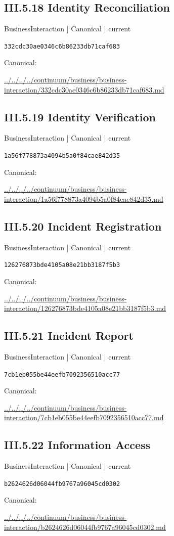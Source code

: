 \documentclass[10pt,a4paper]{article}
\begin{document}
\subsection*{III.5.18 Identity Reconciliation}
{\small BusinessInteraction | Canonical | current}\par
\texttt{332cdc30ae0346c6b86233db71caf683}\par
Canonical: \par
{\footnotesize\url{../../../../continuum/business/business-interaction/332cdc30ae0346c6b86233db71caf683.md}}\par
\subsection*{III.5.19 Identity Verification}
{\small BusinessInteraction | Canonical | current}\par
\texttt{1a56f778873a4094b5a0f84cae842d35}\par
Canonical: \par
{\footnotesize\url{../../../../continuum/business/business-interaction/1a56f778873a4094b5a0f84cae842d35.md}}\par
\subsection*{III.5.20 Incident Registration}
{\small BusinessInteraction | Canonical | current}\par
\texttt{126276873bde4105a08e21bb3187f5b3}\par
Canonical: \par
{\footnotesize\url{../../../../continuum/business/business-interaction/126276873bde4105a08e21bb3187f5b3.md}}\par
\subsection*{III.5.21 Incident Report}
{\small BusinessInteraction | Canonical | current}\par
\texttt{7cb1eb055be44eefb7092356510acc77}\par
Canonical: \par
{\footnotesize\url{../../../../continuum/business/business-interaction/7cb1eb055be44eefb7092356510acc77.md}}\par
\subsection*{III.5.22 Information Access}
{\small BusinessInteraction | Canonical | current}\par
\texttt{b2624626d06044fb9767a96045cd0302}\par
Canonical: \par
{\footnotesize\url{../../../../continuum/business/business-interaction/b2624626d06044fb9767a96045cd0302.md}}\par
\end{document}
